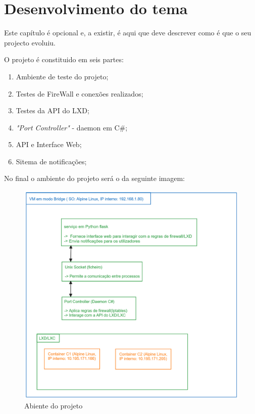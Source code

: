 \chapter{Desenvolvimento do tema}
\label{cap:experiments}

Este capítulo é opcional e, a existir, é aqui que deve descrever como é que o seu projecto evoluiu.

O projeto é constituido em seis partes:

\begin{enumerate}
    \item Ambiente de teste do projeto;
    \item Testes de FireWall e conexões realizados;
    \item Testes da API do LXD;
    \item \textit{"Port Controller"} - daemon em C\#;
    \item API e Interface Web;
    \item Sitema de notificações;
\end{enumerate}


No final o ambiente do projeto será o da seguinte imagem:

\begin{figure}[H]
\begin{center}
\includegraphics[width=14cm]{figs/estrutura2.png}
\caption{Abiente do projeto}
\label{fig:bookstack}
\end{center}
\end{figure}



